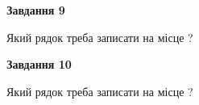 \documentclass[12pt, ukrainian]{article}
\begin{document}
{\begin {large}
{\begin {center}\textbf{Завдання 9}\end {center}}\par
Який рядок треба записати на місце  ?\par
\vspace{5mm}


{\begin {center}\textbf{Завдання 10}\end {center}}\par
Який рядок треба записати на місце  ?\par


\newpage


\end {large}}
\end{document}
